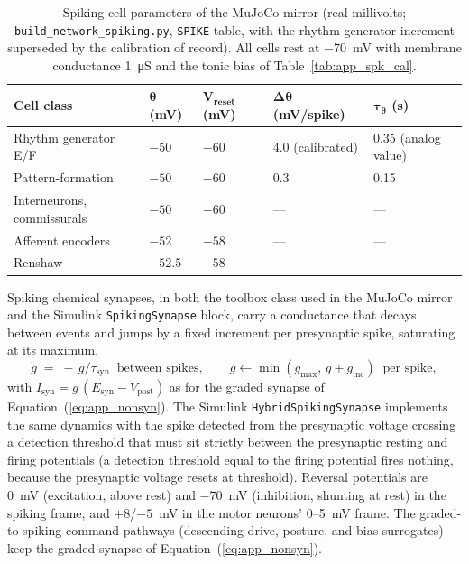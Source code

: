 \begin{table}[htbp]
\caption{Spiking cell parameters of the MuJoCo mirror (real millivolts; \texttt{build\_network\_spiking.py}, \texttt{SPIKE} table, with the rhythm-generator increment superseded by the calibration of record). All cells rest at \qty{-70}{\mV} with membrane conductance \qty{1}{\micro\siemens} and the tonic bias of Table~\ref{tab:app_spk_cal}.}
\label{tab:app_spk_cells}
\begin{tabular}{@{}lllll@{}}
\toprule
\textbf{Cell class} & $\boldsymbol{\theta}$ \textbf{(mV)} & $\boldsymbol{V_{\text{reset}}}$ \textbf{(mV)} & $\boldsymbol{\Delta\theta}$ \textbf{(mV/spike)} & $\boldsymbol{\tau_{\theta}}$ \textbf{(s)} \\
\midrule
Rhythm generator E/F & $-50$ & $-60$ & 4.0 (calibrated) & 0.35 (analog value) \\
Pattern-formation     & $-50$ & $-60$ & 0.3 & 0.15 \\
Interneurons, commissurals & $-50$ & $-60$ & --- & --- \\
Afferent encoders     & $-52$ & $-58$ & --- & --- \\
Renshaw               & $-52.5$ & $-58$ & --- & --- \\
\bottomrule
\end{tabular}
\end{table}

Spiking chemical synapses, in both the toolbox class used in the MuJoCo mirror and the Simulink \texttt{SpikingSynapse} block, carry a conductance that decays between events and jumps by a fixed increment per presynaptic spike, saturating at its maximum,
\begin{equation}
    \dot{g} \;=\; -\,g/\tau_{\text{syn}} \;\;\text{between spikes}, 
    \qquad g \leftarrow \min\!\left(g_{\max},\, g + g_{\text{inc}}\right) \;\;\text{per spike},
    \label{eq:app_spk_syn}
\end{equation}
with $I_{\text{syn}} = g\,(E_{\text{syn}} - V_{\text{post}})$ as for the graded synapse of Equation~(\ref{eq:app_nonsyn}). The Simulink \texttt{HybridSpikingSynapse} implements the same dynamics with the spike detected from the presynaptic voltage crossing a detection threshold that must sit strictly between the presynaptic resting and firing potentials (a detection threshold equal to the firing potential fires nothing, because the presynaptic voltage resets at threshold). Reversal potentials are \qty{0}{\mV} (excitation, above rest) and \qty{-70}{\mV} (inhibition, shunting at rest) in the spiking frame, and $+8$/$-5$~mV in the motor neurons' 0--5~mV frame. The graded-to-spiking command pathways (descending drive, posture, and bias surrogates) keep the graded synapse of Equation~(\ref{eq:app_nonsyn}).

